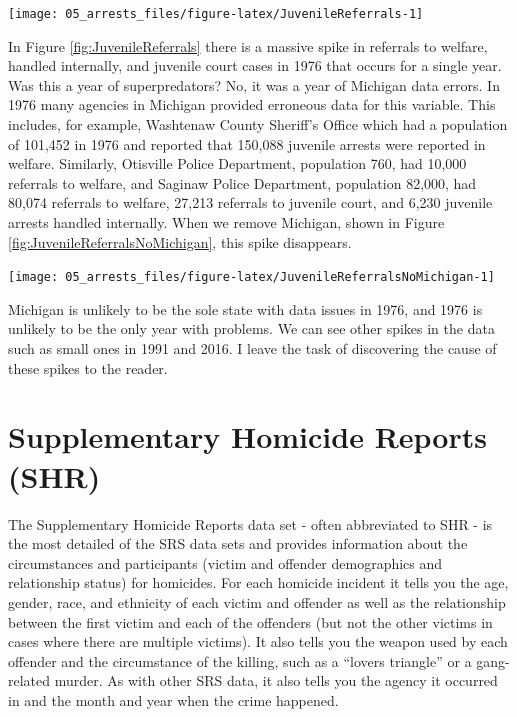 \documentclass[
]{krantz}
\let\origfigure\figure
\let\endorigfigure\endfigure
\renewenvironment{figure}[1][2] {
    \expandafter\origfigure\expandafter[H]
} {
    \endorigfigure
}
\begin{document}
\begin{figure}

{\centering \texttt{[image: 05\_arrests\_files/figure-latex/JuvenileReferrals-1]} 

}

\caption{The annual number of juvenile referrals in the United States by referral type, 1974-2020.}\label{fig:JuvenileReferrals}
\end{figure}

In Figure \ref{fig:JuvenileReferrals} there is a massive
spike in referrals to welfare, handled internally, and
juvenile court cases in 1976 that occurs for a single year.
Was this a year of superpredators? No, it was a year of
Michigan data errors. In 1976 many agencies in Michigan
provided erroneous data for this variable. This includes,
for example, Washtenaw County Sheriff's Office which had a
population of 101,452 in 1976 and reported that 150,088
juvenile arrests were reported in welfare. Similarly,
Otisville Police Department, population 760, had 10,000
referrals to welfare, and Saginaw Police Department,
population 82,000, had 80,074 referrals to welfare, 27,213
referrals to juvenile court, and 6,230 juvenile arrests
handled internally. When we remove Michigan, shown in Figure
\ref{fig:JuvenileReferralsNoMichigan}, this spike
disappears.

\begin{figure}

{\centering \texttt{[image: 05\_arrests\_files/figure-latex/JuvenileReferralsNoMichigan-1]} 

}

\caption{The annual number of juvenile referrals in the United States excluding agencies in Michigan by referral type, 1974-2020.}\label{fig:JuvenileReferralsNoMichigan}
\end{figure}

Michigan is unlikely to be the sole state with data issues
in 1976, and 1976 is unlikely to be the only year with
problems. We can see other spikes in the data such as small
ones in 1991 and 2016. I leave the task of discovering the
cause of these spikes to the reader.

\chapter{Supplementary Homicide Reports (SHR)}\label{shr}

The Supplementary Homicide Reports data set - often
abbreviated to SHR - is the most detailed of the SRS
data sets and provides information about the circumstances
and participants (victim and offender demographics and
relationship status) for homicides. For each homicide
incident it tells you the age, gender, race, and ethnicity
of each victim and offender as well as the relationship
between the first victim and each of the offenders (but not
the other victims in cases where there are multiple
victims). It also tells you the weapon used by each offender
and the circumstance of the killing, such as a ``lovers
triangle'' or a gang-related murder. As with other SRS data,
it also tells you the agency it occurred in and the month
and year when the crime happened.
\end{document}
